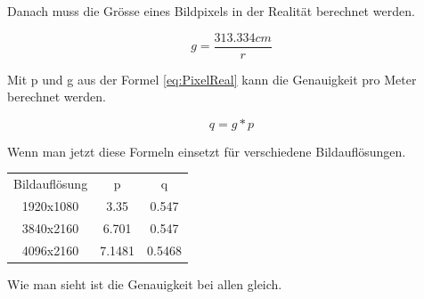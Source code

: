 Danach muss die Grösse eines Bildpixels in der Realität berechnet werden.

\begin{equation}
g = \frac{313.334cm}{r}
\label{eq:PixelReal}
\end{equation}

Mit p und g aus der Formel \ref{eq:PixelReal} kann die Genauigkeit pro Meter berechnet werden.

\begin{equation}
q = g * p
\label{eq:precision}
\end{equation}

Wenn man jetzt diese Formeln einsetzt für verschiedene Bildauflösungen.

\begin{center}
    \begin{tabular}{ c c c }
    \label{tab:resolutions}
     Bildauflösung & p & q \\ 
     1920x1080 & 3.35 & 0.547 \\  
     3840x2160 & 6.701 & 0.547 \\
     4096x2160 & 7.1481 & 0.5468 \\ 
\end{tabular}
\end{center}

Wie man sieht ist die Genauigkeit  bei allen gleich.
